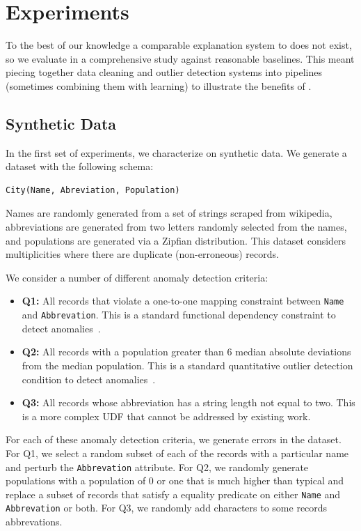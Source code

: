 



\section{Experiments}\label{s:exp}
To the best of our knowledge a comparable explanation system to \sys does not exist, so we evaluate \sys in a comprehensive study against reasonable baselines. This meant piecing together data cleaning and outlier detection systems into pipelines (sometimes combining them with learning) to illustrate the benefits of \sys.  

\subsection{Synthetic Data}
In the first set of experiments, we characterize \sys on synthetic data. We generate a dataset with the following schema:
\begin{lstlisting}
City(Name, Abreviation, Population)
\end{lstlisting}
Names are randomly generated from a set of strings scraped from wikipedia, abbreviations are generated from two letters randomly selected from the names, and populations are generated via a Zipfian distribution. This dataset considers multiplicities where there are duplicate (non-erroneous) records.

We consider a number of different anomaly detection criteria:
\begin{itemize}[leftmargin=*, topsep=0mm, itemsep=0mm]
    \item \textbf{Q1: } All records that violate a one-to-one mapping constraint between \texttt{Name} and \texttt{Abbrevation}. This is a standard functional dependency constraint to detect anomalies~\cite{DBLP:conf/sigmod/ChalamallaIOP14}.
    \item \textbf{Q2: } All records with a population greater than 6 median absolute deviations from the median population. This is a standard quantitative outlier detection condition to detect anomalies~\cite{bailis2016macrobase,scorpion}. 
    \item \textbf{Q3: } All records whose abbreviation has a string length not equal to two. This is a more complex UDF that cannot be addressed by existing work.
\end{itemize}
For each of these anomaly detection criteria, we generate errors in the dataset. For Q1, we select a random subset of each of the records with a particular name and perturb the \texttt{Abbrevation} attribute. For Q2, we randomly generate populations with a population of 0 or one that is much higher than typical and replace a subset of records that satisfy a equality predicate on either \texttt{Name} and \texttt{Abbrevation} or both.
For Q3, we randomly add characters to some records abbrevations.

